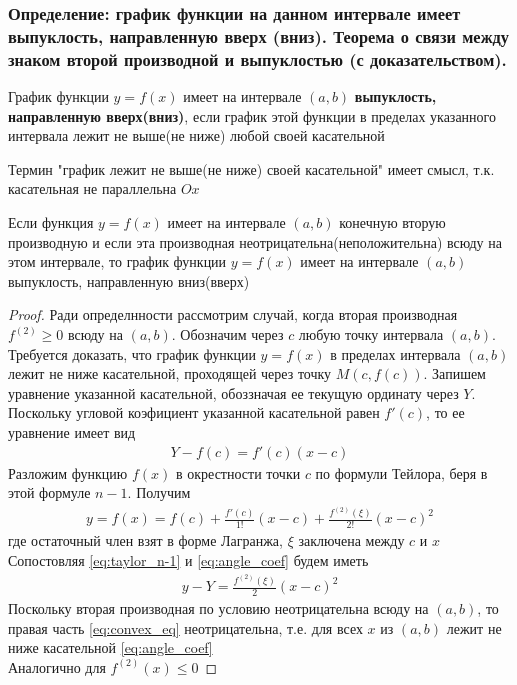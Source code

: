 \documentclass[10pt]{article}
\begin{document}



    \subsubsection{Определение: график функции на данном интервале имеет выпуклость, направленную вверх (вниз). Теорема о связи между знаком второй производной и выпуклостью (с доказательством).}
    \begin{definition}
        График функции $y = f(x)$ имеет на интервале $(a, b)$ \textbf{выпуклость, направленную вверх(вниз)}, если график этой функции в пределах указанного интервала лежит не выше(не ниже) любой своей касательной
    \end{definition}
    \begin{remark}
        Термин "график лежит не выше(не ниже) своей касательной" имеет смысл, т.к. касательная не параллельна $Ox$
    \end{remark}
    \begin{theorem}
        Если функция $y = f(x)$ имеет на интервале $(a, b)$ конечную вторую производную и если эта производная неотрицательна(неположительна) всюду на этом интервале, то график функции $y = f(x)$ имеет на интервале $(a, b)$ выпуклость, направленную вниз(вверх)
    \end{theorem}
    \begin{proof}
        Ради определнности рассмотрим случай, когда вторая производная $f^{(2)} \geq 0$ всюду на $(a, b)$. Обозначим через $c$ любую точку интервала $(a, b)$. Требуется доказать, что график функции $y = f(x)$ в пределах интервала $(a, b)$ лежит не ниже касательной, проходящей через точку $M(c, f(c))$. Запишем уравнение указанной касательной, обоззначая ее текущую ординату через $Y$. Поскольку угловой коэфициент указанной касательной равен $f'(c)$, то ее уравнение имеет вид
        \begin{gather}
            Y - f(c) = f'(c)(x-c) \label{eq:angle_coef}
        \end{gather}
        Разложим функцию $f(x)$ в окрестности точки $c$ по формули Тейлора, беря в этой формуле $n-1$. Получим
        \begin{gather}
            y = f(x) = f(c) + \frac{f'(c)}{1!}(x-c) + \frac{f^{(2)}(\xi)}{2!}(x-c)^2 \label{eq:taylor_n-1}
        \end{gather}
        где остаточный член взят в форме Лагранжа, $\xi$ заключена между $c$ и $x$\\
        Сопостовляя \ref{eq:taylor_n-1} и \ref{eq:angle_coef} будем иметь
        \begin{gather}
            y-Y=\frac{f^{(2)}(\xi)}{2}(x-c)^2 \label{eq:convex_eq}
        \end{gather}
        Поскольку вторая производная по условию неотрицательна всюду на $(a, b)$, то правая часть \ref{eq:convex_eq} неотрицательна, т.е. для всех $x$ из $(a, b)$ лежит не ниже касательной \ref{eq:angle_coef}\\
        Аналогично для $f^{(2)}(x) \leq 0$
    \end{proof}
\end{document}
